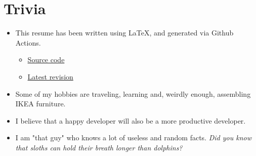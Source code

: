\documentclass{article}
\begin{document}
{	\section*{Trivia}
	\begin{itemize}
		\item This resume has been written using \LaTeX, and generated via Github Actions.
		\begin{itemize}
			\item \textcolor{Green}{\href{https://github.com/Kyngo/Resume}{Source code}}
			\item \textcolor{Green}{\href{https://github.com/Kyngo/Resume/releases/latest}{Latest revision}}
		\end{itemize}
		\item Some of my hobbies are traveling, learning and, weirdly enough, assembling IKEA furniture.
		\item I believe that a happy developer will also be a more productive developer.
		\item I am "that guy" who knows a lot of useless and random facts. \textit{Did you know that sloths can hold their breath longer than dolphins?}
	\end{itemize}
	
}
\end{document}
